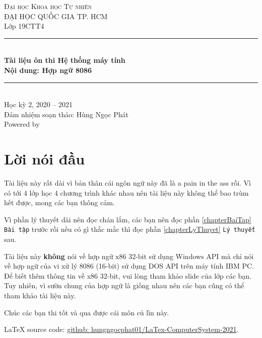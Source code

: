 \documentclass[12pt]{report}
\newcommand{\cd}[1]{\texttt{#1}}
\begin{document}
\begin{titlepage}
    \vspace*{\fill}

    \centering
    \textsc{\LARGE Đại học Khoa học Tự nhiên}\\[0.5cm]
    \textsc{\large ĐẠI HỌC QUỐC GIA TP. HCM}\\[0.5cm]
    
    {\Large Lớp 19CTT4}\\[1.5cm]

    \rule{\textwidth}{0.4pt} \\[0.4cm]
    {
        \huge \bfseries Tài liệu ôn thi Hệ thống máy tính\\
        Nội dung: Hợp ngữ 8086
    }
    \rule{\textwidth}{0.4pt}\\[1.5cm]
    
    {\Large Học kỳ 2, 2020 -- 2021}\\[1.5cm]
    {\large Đảm nhiệm soạn thảo: Hùng Ngọc Phát \\
    Powered by \LaTeXe}
    \vspace*{\fill}

\end{titlepage}


\section*{Lời nói đầu}
Tài liệu này rất dài vì bản thân cái ngôn ngữ này đã là a pain in the ass rồi. Vì có tới 4 lớp học 4 chương trình khác nhau nên tài liệu này không thể bao trùm hết được, mong các bạn thông cảm.\bigskip

Vì phần lý thuyết dài nên đọc chán lắm, các bạn nên đọc phần \ref{chapterBaiTap} \cd{Bài tập} trước rồi nếu có gì thắc mắc thì đọc phần \ref{chapterLyThuyet} \cd{Lý thuyết} sau. \bigskip

Tài liệu này \textbf{không} nói về hợp ngữ x86 32-bit sử dụng Windows API mà chỉ nói về hợp ngữ của vi xử lý 8086 (16-bit) sử dụng DOS API trên máy tính IBM PC. Để biết thêm thông tin về x86 32-bit, vui lòng tham khảo slide của lớp các bạn. Tuy nhiên, vì sườn chung của hợp ngữ là giống nhau nên các bạn cũng có thể tham khảo tài liệu này.\bigskip

Chúc các bạn thi tốt và qua được cái môn {\tiny củ lìn} này.\\
\vspace*{\fill}

{\LaTeX} source code: \href{https://github.com/hungngocphat01/LaTex-ComputerSystem-2021}{github: hungngocphat01/LaTex-ComputerSystem-2021}.
\pagebreak
\end{document}
